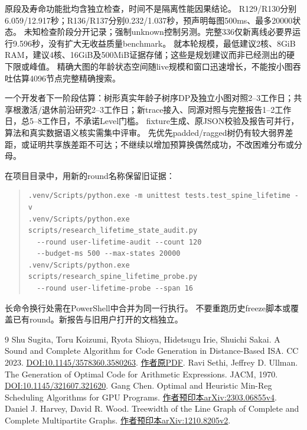 \documentclass[UTF8,11pt,a4paper]{ctexart}
\begin{document}
原段及寿命功能批均含独立检查，时间不是隔离性能因果结论。
R129/R130分别6.059/12.917秒；R136/R137分别0.232/1.037秒，预声明每图500ms、最多20000状态。
未知检查阶段分开记录；强制unknown控制另测。完整336仅新离线必要界运行9.596秒，没有扩大无收益质量benchmark。
就本轮规模，最低建议2核、8GiB RAM，建议4核、16GiB及500MiB证据存储；这些是规划建议而非已经测出的硬下限或峰值。
精确大图的年龄状态空间随live规模和窗口迅速增长，不能按小图吞吐估算4096节点完整精确搜索。

一个开发者下一阶段估算：树形真实年龄子树序DP及独立小图对照2--3工作日；共享根激活/退休前沿研究2--3工作日；新trace接入、同源对照与完整报告1--2工作日，总5--8工作日，不承诺Level门槛。
fixture生成、原JSON校验及报告可并行，算法和真实数据语义核实需集中评审。
先优先padded/ragged树仍有较大弱界差距，或证明共享族差距不可达；不继续以增加预算换偶然成功，不改困难分布或分母。

在项目目录中，用新的round名称保留旧证据：
\begin{quote}\small
\begin{verbatim}
.venv/Scripts/python.exe -m unittest tests.test_spine_lifetime -v
.venv/Scripts/python.exe scripts/research_lifetime_state_audit.py
  --round user-lifetime-audit --count 120
  --budget-ms 500 --max-states 20000
.venv/Scripts/python.exe scripts/research_spine_lifetime_probe.py
  --round user-lifetime-probe --span 16
\end{verbatim}
\end{quote}
长命令换行处需在PowerShell中合并为同一行执行。
不要重跑历史freeze脚本或覆盖已有round。新报告与旧用户打开的文档独立。

\begin{thebibliography}{9}
 Shu Sugita, Toru Koizumi, Ryota Shioya, Hidetsugu Irie, Shuichi Sakai.
A Sound and Complete Algorithm for Code Generation in Distance-Based ISA. CC 2023.
\href{https://doi.org/10.1145/3578360.3580263}{DOI:10.1145/3578360.3580263}.
\href{https://www.rsg.ci.i.u-tokyo.ac.jp/lab/en/assets/files/cc2023-sugita.pdf}{作者原PDF}.
 Ravi Sethi, Jeffrey D. Ullman.
The Generation of Optimal Code for Arithmetic Expressions. JACM, 1970.
\href{https://doi.org/10.1145/321607.321620}{DOI:10.1145/321607.321620}.
 Gang Chen. Optimal and Heuristic Min-Reg Scheduling Algorithms for GPU Programs.
\href{https://arxiv.org/abs/2303.06855v4}{作者预印本arXiv:2303.06855v4}.
 Daniel J. Harvey, David R. Wood.
Treewidth of the Line Graph of Complete and Complete Multipartite Graphs.
\href{https://arxiv.org/abs/1210.8205v2}{作者预印本arXiv:1210.8205v2}.
\end{thebibliography}
\end{document}
